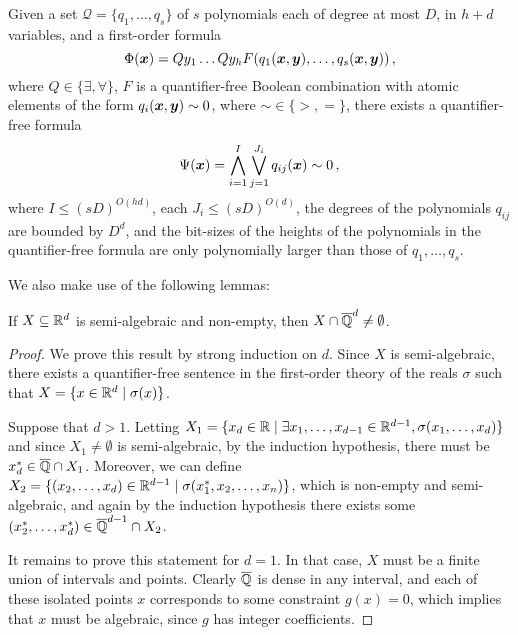 \begin{theorem}
\label{thm:quant-elim}
Given a set $\mathcal{Q}=\lbrace q_1,\ldots,q_s\rbrace$ of $s$   polynomials each of degree at most $D$, in $h+d$ variables, and a first-order formula
\begin{equation*}
  \Phi(\boldsymbol x)=Q y_1 \ldots Q y_h   F(q_1(\boldsymbol x,\boldsymbol y),\ldots,q_s(\boldsymbol x,\boldsymbol y)) \, ,
\end{equation*}
where $Q\in\lbrace \exists,\forall\rbrace$, $F$ is a quantifier-free Boolean combination with atomic elements of the form $q_i(\boldsymbol x,\boldsymbol y)\sim 0$, where $\sim \in \lbrace >, = \rbrace$, there exists a quantifier-free formula
\begin{equation*}
\Psi(\boldsymbol{x}) = \bigwedge_{i=1}^{I} \bigvee_{j=1}^{J_i} q_{ij}(\boldsymbol{x}) \sim 0 \, ,
\end{equation*}
where $I\leq {(sD)}^{O(hd)}$, each $J_{i}\leq {(sD)}^{O(d)}$, the degrees of the   polynomials $q_{ij}$ are bounded by $D^{d}$, and the bit-sizes of the heights of the polynomials in the quantifier-free formula are only   polynomially larger than those of $q_1,\ldots,q_s$.
\end{theorem}

We also make use of the following lemmas:
\begin{lemma}
  If $X\subseteq\mathbb{R}^{d}$ is semi-algebraic and non-empty, then
  $X\cap\overline{\mathbb{Q}}^{d}\neq\emptyset$.
\end{lemma}

\begin{proof}
  We prove this result by strong induction on $d$. Since $X$ is
  semi-algebraic, there exists a quantifier-free sentence in the
  first-order theory of the reals $\sigma$ such that $X=\lbrace
  x\in\mathbb{R}^{d}\mid \sigma(x)\rbrace$.

  Suppose that $d>1$. Letting $X_1=\lbrace x_d\in\mathbb{R}\mid
  \exists
  x_1,\ldots,x_{d-1}\in\mathbb{R}^{d-1},\sigma(x_1,\ldots,x_d)\rbrace$
  and since $X_1\neq\emptyset$ is semi-algebraic, by the induction
  hypothesis, there must be $x_d^*\in\overline{\mathbb{Q}}\cap X_1$. Moreover, we
  can define $X_2=\lbrace (x_2,\ldots,x_d)\in\mathbb{R}^{d-1}\mid
  \sigma(x_1^*,x_2,\ldots,x_n)\rbrace$, which is non-empty and
  semi-algebraic, and again by the induction hypothesis there exists some
  $(x_2^*,\ldots,x_d^*)\in\overline{\mathbb{Q}}^{d-1}\cap X_2$.

  It remains to prove this statement for $d=1$. In that case, $X$ must
  be a finite union of intervals and points.
  Clearly $\overline{\mathbb{Q}}$ is dense in any interval, and each of these isolated
  points $x$ corresponds to some constraint $g(x)=0$, which implies
  that $x$ must be algebraic, since $g$ has integer coefficients.
\end{proof}

